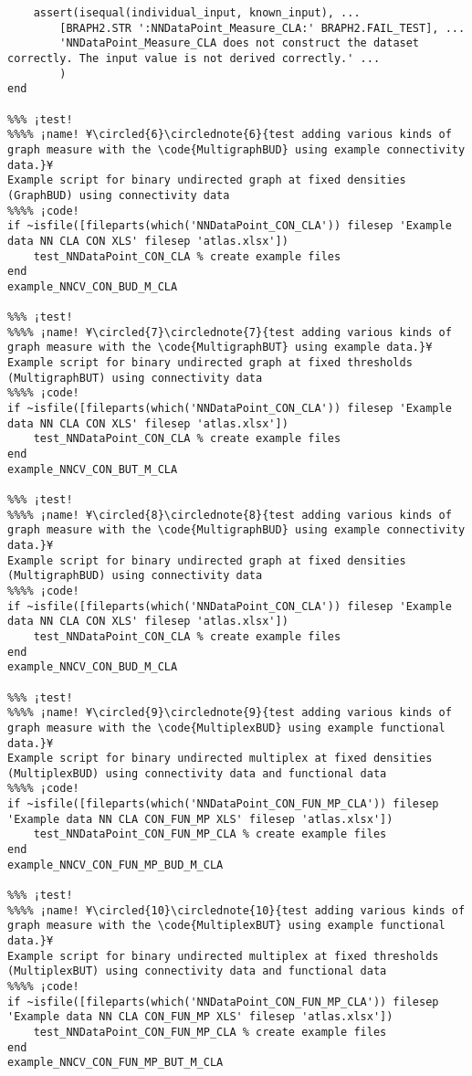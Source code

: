 \documentclass{tufte-handout}
\begin{document}
\begin{lstlisting}
    assert(isequal(individual_input, known_input), ...
        [BRAPH2.STR ':NNDataPoint_Measure_CLA:' BRAPH2.FAIL_TEST], ...
        'NNDataPoint_Measure_CLA does not construct the dataset correctly. The input value is not derived correctly.' ...
        )
end

%%% ¡test!
%%%% ¡name! ¥\circled{6}\circlednote{6}{test adding various kinds of graph measure with the \code{MultigraphBUD} using example connectivity data.}¥
Example script for binary undirected graph at fixed densities (GraphBUD) using connectivity data
%%%% ¡code!
if ~isfile([fileparts(which('NNDataPoint_CON_CLA')) filesep 'Example data NN CLA CON XLS' filesep 'atlas.xlsx'])
    test_NNDataPoint_CON_CLA % create example files
end
example_NNCV_CON_BUD_M_CLA

%%% ¡test!
%%%% ¡name! ¥\circled{7}\circlednote{7}{test adding various kinds of graph measure with the \code{MultigraphBUT} using example data.}¥
Example script for binary undirected graph at fixed thresholds (MultigraphBUT) using connectivity data
%%%% ¡code!
if ~isfile([fileparts(which('NNDataPoint_CON_CLA')) filesep 'Example data NN CLA CON XLS' filesep 'atlas.xlsx'])
    test_NNDataPoint_CON_CLA % create example files
end
example_NNCV_CON_BUT_M_CLA

%%% ¡test!
%%%% ¡name! ¥\circled{8}\circlednote{8}{test adding various kinds of graph measure with the \code{MultigraphBUD} using example connectivity data.}¥
Example script for binary undirected graph at fixed densities (MultigraphBUD) using connectivity data
%%%% ¡code!
if ~isfile([fileparts(which('NNDataPoint_CON_CLA')) filesep 'Example data NN CLA CON XLS' filesep 'atlas.xlsx'])
    test_NNDataPoint_CON_CLA % create example files
end
example_NNCV_CON_BUD_M_CLA

%%% ¡test!
%%%% ¡name! ¥\circled{9}\circlednote{9}{test adding various kinds of graph measure with the \code{MultiplexBUD} using example functional data.}¥
Example script for binary undirected multiplex at fixed densities (MultiplexBUD) using connectivity data and functional data
%%%% ¡code!
if ~isfile([fileparts(which('NNDataPoint_CON_FUN_MP_CLA')) filesep 'Example data NN CLA CON_FUN_MP XLS' filesep 'atlas.xlsx'])
    test_NNDataPoint_CON_FUN_MP_CLA % create example files
end
example_NNCV_CON_FUN_MP_BUD_M_CLA

%%% ¡test!
%%%% ¡name! ¥\circled{10}\circlednote{10}{test adding various kinds of graph measure with the \code{MultiplexBUT} using example functional data.}¥
Example script for binary undirected multiplex at fixed thresholds (MultiplexBUT) using connectivity data and functional data
%%%% ¡code!
if ~isfile([fileparts(which('NNDataPoint_CON_FUN_MP_CLA')) filesep 'Example data NN CLA CON_FUN_MP XLS' filesep 'atlas.xlsx'])
    test_NNDataPoint_CON_FUN_MP_CLA % create example files
end
example_NNCV_CON_FUN_MP_BUT_M_CLA

\end{lstlisting}

%
%
\end{document}
